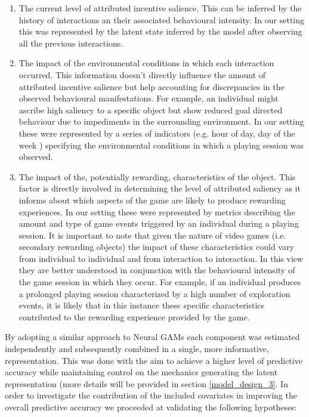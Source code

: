 \begin{enumerate}
    \item The current level of attributed incentive salience. This can be inferred by the history of interactions an their associated behavioural intensity. In our setting this was represented by the latent state inferred by the model after observing all the previous interactions.
    \item The impact of the environmental conditions in which each interaction occurred. This information doesn't directly influence the amount of attributed incentive salience but help accounting for discrepancies in the observed behavioural manifestations. For example, an individual might ascribe high saliency to a specific object but show reduced goal directed behaviour due to impediments in the surrounding environment. In our setting these were represented by a series of indicators (e.g. hour of day, day of the week ) specifying the environmental conditions in which a playing session was observed.
    \item The impact of the, potentially rewarding, characteristics of the object. This factor is directly involved in determining the level of attributed saliency as it informs about which aspects of the game are likely to produce rewarding experiences. In our setting these were represented by metrics describing the amount and type of game events triggered by an individual during a playing session. It is important to note that given the nature of video games (i.e. secondary rewarding objects) the impact of these characteristics could vary from individual to individual and from interaction to interaction. In this view they are better understood in conjunction with the behavioural intensity of the game session in which they occur. For example, if an individual produces a prolonged playing session characterized by a high number of exploration events, it is likely that in this instance these specific characteristics contributed to the rewarding experience provided by the game.
\end{enumerate}
By adopting a similar approach to Neural GAMs \cite{agarwal2021neural} each component was estimated independently and subsequently combined in a single, more informative, representation. This was done with the aim to achieve a higher level of predictive accuracy while maintaining control on the mechanics generating the latent representation (more details will be provided in section \ref{model_design_3}. In order to investigate the contribution of the included covariates in improving the overall predictive accuracy we proceeded at validating the following hypotheses:
